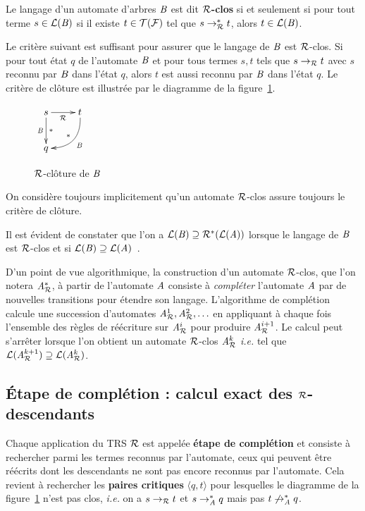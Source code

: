 \begin{definition}
  Le langage d'un automate d'arbres $\mathit B$ est dit \textbf{$\mathcal R$-clos} si et seulement si 
  pour tout terme $s \in \mathcal{L}(\mathit B)$ si il existe $t \in \mathcal{T(F)}$ tel que $s \rightarrow_\mathcal R^* t$, 
  alors $t \in \mathcal{L}(\mathit B)$. 

  Le critère suivant est suffisant pour assurer que le langage de $\mathit B$ est $\mathcal R$-clos.
  Si pour tout état $q$ de l'automate $\mathit B$ et pour tous termes $s,t$ tels que 
  $s \rightarrow_\mathcal R t$ avec $s$ reconnu par $\mathit B$ dans l'état $q$, alors $t$ est aussi reconnu par $\mathit B$ dans l'état $q$.
  Le critère de clôture est illustrée par le diagramme de la figure~\ref{fig:R-cloture}.
  \begin{figure}[ht!]
    \centering
    $
    \xymatrix{
      s \ar[r]_{\R}\ar[d]^{*}_{\B} & t \ar@/^1.2pc/[ld]_{*}^{\B}\\
      q & %
    }
    $
    \caption{\footnotesize $\mathcal R$-clôture de $\mathit B$}
    \label{fig:R-cloture}
  \end{figure}
  On considère toujours implicitement qu'un automate $\mathcal R$-clos
  assure toujours le critère de clôture.
\end{definition}

Il est évident de constater que l'on a $\mathcal{L}(\mathit B) \supseteq \mathcal R^*(\mathcal{L}(\mathit A))$
lorsque le langage de $\mathit B$ est $\mathcal R$-clos et si $\mathcal{L}(\mathit B)\supseteq \mathcal{L}(\mathit A)$~\cite{BoyerGJ-IJCAR08}.

D'un point de vue algorithmique, la construction d'un automate $\mathcal R$-clos, que l'on notera
${\mathit A}_{\mathcal R}^*$, à partir de l'automate $\mathit A$ consiste à \textit{compléter} l'automate $\mathit A$
par de nouvelles transitions pour étendre son langage. L'algorithme de complétion
calcule une succession d'automates ${\mathit A}_{\mathcal R}^1,{\mathit A}_{\mathcal R}^2,\ldots$ en appliquant à chaque fois
l'ensemble des règles de réécriture sur ${\mathit A}_{\mathcal R}^i$ pour produire ${\mathit A}_{\mathcal R}^{i+1}$.
Le calcul peut s'arrêter lorsque l'on obtient un automate $\mathcal R$-clos 
${\mathit A}_{\mathcal R}^k$ \textit{i.e.} tel que $\mathcal{L}({\mathit A}_{\mathcal R}^{k+1}) \supseteq \mathcal{L}({\mathit A}_{\mathcal R}^k)$.

\subsection{Étape de complétion : calcul exact des $\mathcal R$-descendants}


Chaque application du TRS $\mathcal R$  est appelée \textbf{étape de complétion} et 
consiste à rechercher parmi les termes reconnus par l'automate, ceux qui peuvent être réécrits
dont les descendants ne sont pas encore reconnus par l'automate.
Cela revient à rechercher les \textbf{paires critiques} $\langle q, t \rangle$ 
pour lesquelles le diagramme de la figure~\ref{fig:R-cloture} n'est pas clos, \textit{i.e.}
on a $s \rightarrow_\mathcal R t$ et $s \rightarrow_{\mathit A}^* q$ mais pas $t \not\rightarrow_{\mathit A}^* q$.

